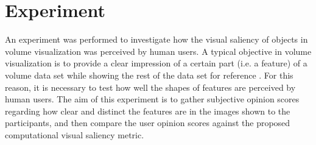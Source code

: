\section{Experiment \label{experiment_section}}

An experiment was performed to investigate how the visual saliency of objects in volume visualization was perceived by human users. A typical objective in volume visualization is to provide a clear impression of a certain part (i.e. a feature) of a volume data set while showing the rest of the data set for reference \cite{redmond_influencing_2010}.
For this reason, it is necessary to test how well the shapes of features are perceived by human users.
The aim of this experiment is to gather subjective opinion scores regarding how clear and distinct the features are in the images shown to the participants, and then compare the user opinion scores against the proposed computational visual saliency metric.


